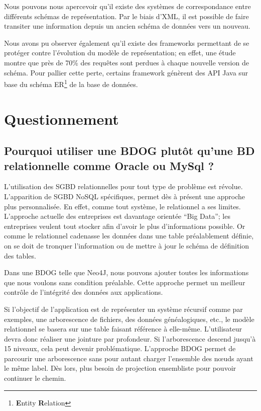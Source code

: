 \documentclass[a4paper,fleqn,12pt,oneside]{report}
\begin{document}
Nous pouvons nous apercevoir qu'il existe des systèmes de correspondance entre différents schémas de représentation. Par le biais d'XML, il est possible de faire transiter une information depuis un ancien schéma de données vers un nouveau. \cite{miller2000schema}

Nous avons pu observer également qu'il existe des frameworks permettant de se protéger contre l'évolution du modèle de représentation; en effet, une étude montre que près de 70\% des requêtes\cite{curino2008schema} sont perdues à chaque nouvelle version de schéma. Pour pallier cette perte, certains framework génèrent des API Java sur base du schéma ER\footnote{\textbf{E}ntity \textbf{R}elation} de la base de données.\cite{cleve2010conceptual}

\section{Questionnement}

\subsection*{Pourquoi utiliser une BDOG plutôt qu'une BD relationnelle comme Oracle ou MySql ?}

L’utilisation des SGBD relationnelles pour tout type de problème est révolue. L’apparition de SGBD NoSQL spécifiques, permet dès à présent une approche plus personnalisée. En effet, comme tout système, le relationnel a ses limites. L’approche actuelle des entreprises est davantage orientée \enquote{Big Data}; les entreprises veulent tout stocker afin d’avoir le plus d’informations possible\cite{lohr2012age}. Or comme le relationnel cadenasse les données dans une table préalablement définie, on se doit de tronquer l’information ou de mettre à jour le schéma de définition des tables. 

Dans une BDOG telle que Neo4J, nous pouvons ajouter toutes les informations que nous voulons sans condition préalable. Cette approche permet un meilleur contrôle de l’intégrité des données aux applications.

Si l’objectif de l’application est de représenter un système récursif comme  par exemples, une arborescence de fichiers, des données généalogiques, etc., le modèle relationnel se basera sur une table faisant référence à elle-même. L’utilisateur devra donc réaliser une jointure par profondeur. Si l’arborescence descend jusqu’à 15 niveaux, cela peut devenir problématique.\cite{miller2013graph} L’approche BDOG permet de parcourir une arborescence sans pour autant charger l’ensemble des nœuds ayant le même label. Dès lors, plus besoin de projection ensembliste pour pouvoir continuer le chemin.
\end{document}
